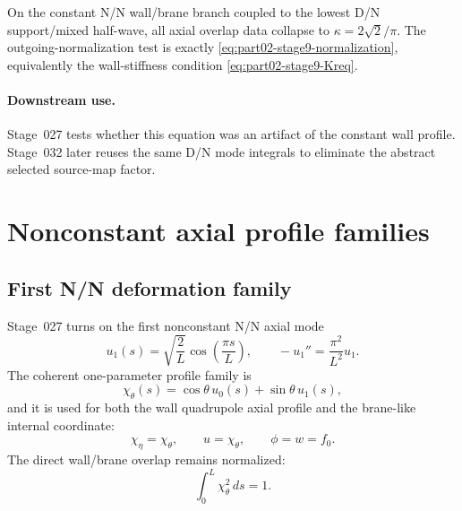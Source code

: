 \begin{proposition}
\label{prop:part02-finite-throat-normalization}
On the constant N/N wall/brane branch coupled to the lowest D/N support/mixed half-wave, all axial overlap data collapse to \(\kappa=2\sqrt2/\pi\).  The outgoing-normalization test is exactly \eqref{eq:part02-stage9-normalization}, equivalently the wall-stiffness condition \eqref{eq:part02-stage9-Kreq}.
\end{proposition}

\paragraph{Downstream use.}
Stage~027 tests whether this equation was an artifact of the constant wall profile.  Stage~032 later reuses the same D/N mode integrals to eliminate the abstract selected source-map factor.

\section{Nonconstant axial profile families}
\label{sec:part02_conservative_response:nonconstant-axial-profile-families}

\subsection{First N/N deformation family}
\label{subsec:part02-stage027-profile-family}

Stage~027 turns on the first nonconstant N/N axial mode
\begin{equation}
\label{eq:part02-u1}
u_1(s)=\sqrt{\frac2L}\cos\!\left(\frac{\pi s}{L}\right),
\qquad
-u_1''=\frac{\pi^2}{L^2}u_1.
\end{equation}
The coherent one-parameter profile family is
\begin{equation}
\label{eq:part02-chi-theta}
\chi_\theta(s)=\cos\theta\,u_0(s)+\sin\theta\,u_1(s),
\end{equation}
and it is used for both the wall quadrupole axial profile and the brane-like internal coordinate:
\begin{equation}
\chi_\eta=\chi_\theta,
\qquad
u=\chi_\theta,
\qquad
\phi=w=f_0.
\end{equation}
The direct wall/brane overlap remains normalized:
\begin{equation}
\int_0^L\chi_\theta^2\,ds=1.
\end{equation}


